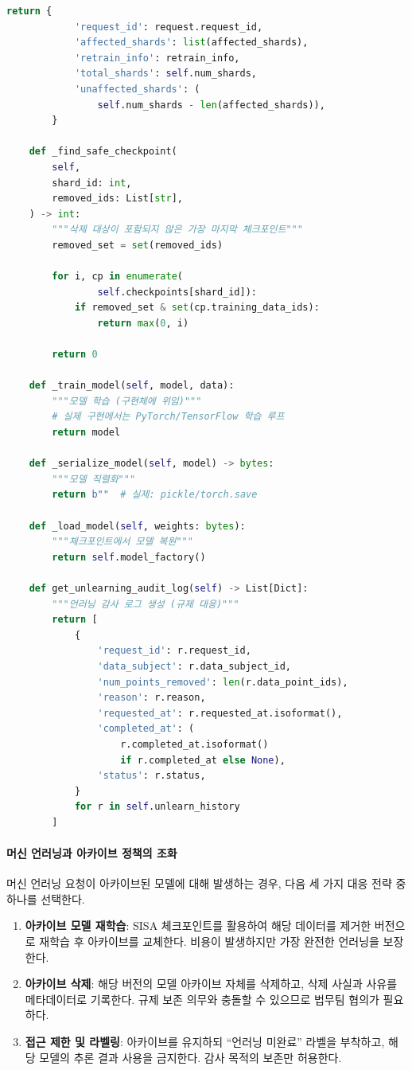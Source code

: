 \begin{lstlisting}[language=Python, caption={SISA 기반 머신 언러닝 구현}, label={lst:sisa_unlearning}]
        return {
            'request_id': request.request_id,
            'affected_shards': list(affected_shards),
            'retrain_info': retrain_info,
            'total_shards': self.num_shards,
            'unaffected_shards': (
                self.num_shards - len(affected_shards)),
        }

    def _find_safe_checkpoint(
        self,
        shard_id: int,
        removed_ids: List[str],
    ) -> int:
        """삭제 대상이 포함되지 않은 가장 마지막 체크포인트"""
        removed_set = set(removed_ids)

        for i, cp in enumerate(
                self.checkpoints[shard_id]):
            if removed_set & set(cp.training_data_ids):
                return max(0, i)

        return 0

    def _train_model(self, model, data):
        """모델 학습 (구현체에 위임)"""
        # 실제 구현에서는 PyTorch/TensorFlow 학습 루프
        return model

    def _serialize_model(self, model) -> bytes:
        """모델 직렬화"""
        return b""  # 실제: pickle/torch.save

    def _load_model(self, weights: bytes):
        """체크포인트에서 모델 복원"""
        return self.model_factory()

    def get_unlearning_audit_log(self) -> List[Dict]:
        """언러닝 감사 로그 생성 (규제 대응)"""
        return [
            {
                'request_id': r.request_id,
                'data_subject': r.data_subject_id,
                'num_points_removed': len(r.data_point_ids),
                'reason': r.reason,
                'requested_at': r.requested_at.isoformat(),
                'completed_at': (
                    r.completed_at.isoformat()
                    if r.completed_at else None),
                'status': r.status,
            }
            for r in self.unlearn_history
        ]
\end{lstlisting}

\paragraph{머신 언러닝과 아카이브 정책의 조화}
머신 언러닝 요청이 아카이브된 모델에 대해 발생하는 경우, 다음 세 가지 대응 전략 중 하나를 선택한다.

\begin{enumerate}
 \item \textbf{아카이브 모델 재학습}: SISA 체크포인트를 활용하여 해당 데이터를 제거한 버전으로 재학습 후 아카이브를 교체한다. 비용이 발생하지만 가장 완전한 언러닝을 보장한다.
 \item \textbf{아카이브 삭제}: 해당 버전의 모델 아카이브 자체를 삭제하고, 삭제 사실과 사유를 메타데이터로 기록한다. 규제 보존 의무와 충돌할 수 있으므로 법무팀 협의가 필요하다.
 \item \textbf{접근 제한 및 라벨링}: 아카이브를 유지하되 ``언러닝 미완료'' 라벨을 부착하고, 해당 모델의 추론 결과 사용을 금지한다. 감사 목적의 보존만 허용한다.
\end{enumerate}


